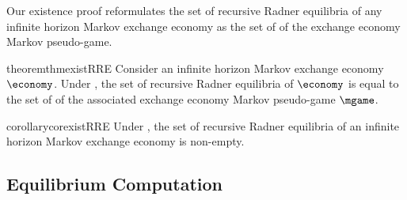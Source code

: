 {%



Our existence proof reformulates the set of recursive Radner equilibria of any infinite horizon Markov exchange economy as the set of \MPGNE{} of the exchange economy Markov pseudo-game.

\begin{restatable}{theorem}{thmexistRRE}
\label{thm:existence_RRE}
    Consider an infinite horizon Markov exchange economy $\economy$. 
    Under , the set of recursive Radner equilibria of $\economy$ is equal to the set of \MPGNE{} of the associated exchange economy Markov pseudo-game $\mgame$.
\end{restatable}
    
\begin{restatable}{corollary}{corexistRRE}
\label{cor:existence_RRE}
    Under , the set of recursive Radner equilibria of an infinite horizon Markov exchange economy is non-empty.
\end{restatable}




\subsection{Equilibrium Computation}
\label{sec:computation}

}
